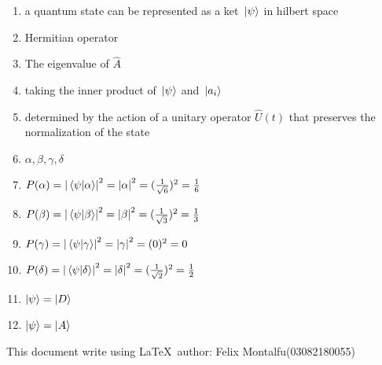 \documentclass[a4paper]{article}
\begin{document}
    \begin{enumerate}[1.]
        \item a quantum state can be represented as a ket $\ket*{\psi}$ in hilbert space
        \item Hermitian operator
        \item The eigenvalue of $\hat{A}$
        \item taking the inner product of $\ket*{\psi}$ and $\ket*{a_{i}}$
        \item determined by the action of a unitary operator $\hat{U}(t)$ that preserves the normalization of the state
        \item $\alpha,\beta,\gamma,\delta$
        \item $P(\alpha) = \abs{\braket*{\psi}{\alpha}}^2 \\ =\abs{\alpha}^2 \\ =(\frac{1}{\sqrt{6}})^2 \\ =\frac{1}{6}$
        \item $P(\beta) = \abs{\braket*{\psi}{\beta}}^2 \\ =\abs{\beta}^2 \\ =(\frac{1}{\sqrt{3}})^2 \\ =\frac{1}{3}$
        \item $P(\gamma) = \abs{\braket*{\psi}{\gamma}}^2 \\ =\abs{\gamma}^2 \\ =(0)^2 \\ =0$
        \item $P(\delta) = \abs{\braket*{\psi}{\delta}}^2 \\ =\abs{\delta}^2 \\ =(\frac{1}{\sqrt{2}})^2 \\ =\frac{1}{2}$
        \item $\ket{\psi} = \ket{D}$
        \item $\ket{\psi} = \ket{A}$
    \end{enumerate}
    This document write using \LaTeX \ author: Felix Montalfu(03082180055)
\end{document}
